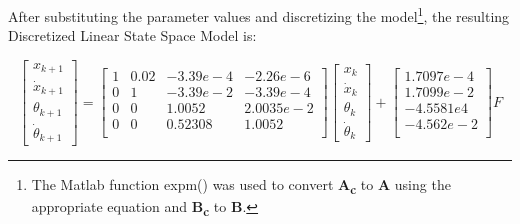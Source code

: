 \documentclass{article}
\begin{document}
After substituting the parameter values and discretizing the model\footnote{The Matlab function expm() was used to convert \textbf{A\textsubscript{c}} to \textbf{A} using the appropriate equation and \textbf{B\textsubscript{c}} to \textbf{B}. }, 
the resulting Discretized Linear State Space Model is:

\begin{equation}
\begin{bmatrix}
x_{k+1} \\
\dot{x}_{k+1} \\
\theta_{k+1} \\
\dot{\theta}_{k+1}
\end{bmatrix}
=
\begin{bmatrix}
1 & 0.02 & -3.39e-4 & -2.26e-6\\
0 & 1 & -3.39e-2 & -3.39e-4\\
0 & 0 & 1.0052 & 2.0035e-2\\
0 & 0 & 0.52308 & 1.0052\\
\end{bmatrix}
\begin{bmatrix}
x_{k} \\
\dot{x}_{k} \\
\theta_{k} \\
\dot{\theta}_{k}
\end{bmatrix}
+
\begin{bmatrix}
1.7097e-4\\
1.7099e-2\\
-4.5581e4\\
-4.562e-2\\
\end{bmatrix}
F
\label{eq:linear_discrete}
\end{equation}
\end{document}
